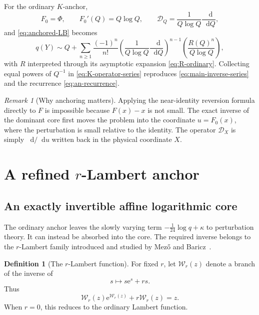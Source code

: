 \documentclass[11pt,oneside]{article}
\theoremstyle{plain}
\theoremstyle{definition}
\newtheorem{definition}[theorem]{Definition}
\theoremstyle{remark}
\newtheorem{remark}[theorem]{Remark}
\newcommand{\rW}{\mathcal{W}}
\newcommand{\e}{\mathrm{e}}
\newcommand{\dd}{\mathop{}\!\mathrm{d}}
\newcommand{\calD}{\mathcal{D}}
\begin{document}
For the ordinary \(K\)-anchor,
\begin{equation}
 F_0=\Phi,
 \qquad F_0'(Q)=Q\log Q,
 \qquad
 \calD_Q=\frac1{Q\log Q}\frac{\dd}{\dd Q},
 \label{eq:K-D-ordinary}
\end{equation}
and \eqref{eq:anchored-LB} becomes
\begin{equation}
 q(Y)\sim Q+
 \sum_{n\ge1}\frac{(-1)^n}{n!}
 \left(\frac1{Q\log Q}\frac{\dd}{\dd Q}\right)^{n-1}
 \left(\frac{R(Q)^n}{Q\log Q}\right),
 \label{eq:K-operator-series}
\end{equation}
with \(R\) interpreted through its asymptotic expansion
\eqref{eq:R-ordinary}.  Collecting equal powers of \(Q^{-1}\) in
\eqref{eq:K-operator-series} reproduces \eqref{eq:main-inverse-series} and the
recurrence \eqref{eq:an-recurrence}.

\begin{remark}[Why anchoring matters]
Applying the near-identity reversion formula directly to \(F\) is impossible
because \(F(x)-x\) is not small.  The exact inverse of the dominant core first
moves the problem into the coordinate \(u=F_0(x)\), where the perturbation is
small relative to the identity.  The operator \(\calD_X\) is simply
\(\dd/\dd u\) written back in the physical coordinate \(X\).
\end{remark}

\section{A refined \texorpdfstring{\(r\)-Lambert}{r-Lambert} anchor}
\label{sec:refined-anchor}

\subsection{An exactly invertible affine logarithmic core}

The ordinary anchor leaves the slowly varying term
\(-\tfrac1{24}\log q+\kappa\) to perturbation theory.  It can instead be
absorbed into the core.  The required inverse belongs to the \(r\)-Lambert
family introduced and studied by Mez\H{o} and Baricz~\cite{MezoBaricz2017}.

\begin{definition}[The \(r\)-Lambert function]
For fixed \(r\), let \(\rW_r(z)\) denote a branch of the inverse of
\begin{equation}
 s\longmapsto s\e^s+rs.
 \label{eq:rW-definition}
\end{equation}
Thus
\begin{equation}
 \rW_r(z)\e^{\rW_r(z)}+r\rW_r(z)=z.
 \label{eq:rW-equation}
\end{equation}
When \(r=0\), this reduces to the ordinary Lambert function.
\end{definition}
\end{document}

